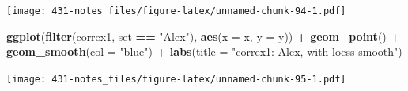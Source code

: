 \documentclass[
]{book}
\newenvironment{Shaded}{\begin{snugshade}}{\end{snugshade}}
\newcommand{\DataTypeTok}[1]{\textcolor[rgb]{0.13,0.29,0.53}{#1}}
\newcommand{\KeywordTok}[1]{\textcolor[rgb]{0.13,0.29,0.53}{\textbf{#1}}}
\newcommand{\NormalTok}[1]{#1}
\newcommand{\OperatorTok}[1]{\textcolor[rgb]{0.81,0.36,0.00}{\textbf{#1}}}
\newcommand{\StringTok}[1]{\textcolor[rgb]{0.31,0.60,0.02}{#1}}
\begin{document}
\texttt{[image: 431-notes\_files/figure-latex/unnamed-chunk-94-1.pdf]}

\begin{Shaded}
\begin{Highlighting}[]
\KeywordTok{ggplot}\NormalTok{(}\KeywordTok{filter}\NormalTok{(correx1, set }\OperatorTok{==}\StringTok{ "Alex"}\NormalTok{), }\KeywordTok{aes}\NormalTok{(}\DataTypeTok{x =}\NormalTok{ x, }\DataTypeTok{y =}\NormalTok{ y)) }\OperatorTok{+}\StringTok{ }
\StringTok{    }\KeywordTok{geom_point}\NormalTok{() }\OperatorTok{+}
\StringTok{    }\KeywordTok{geom_smooth}\NormalTok{(}\DataTypeTok{col =} \StringTok{"blue"}\NormalTok{) }\OperatorTok{+}
\StringTok{    }\KeywordTok{labs}\NormalTok{(}\DataTypeTok{title =} \StringTok{"correx1: Alex, with loess smooth"}\NormalTok{)}
\end{Highlighting}
\end{Shaded}

\texttt{[image: 431-notes\_files/figure-latex/unnamed-chunk-95-1.pdf]}
\end{document}
